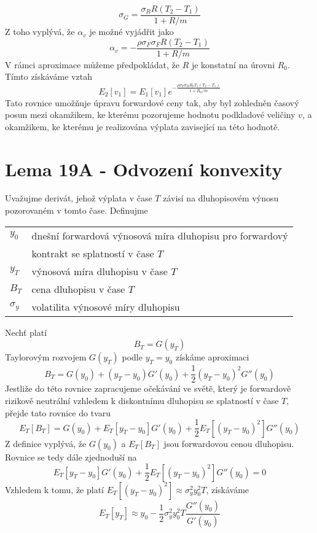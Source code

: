 \documentclass[a4paper]{book}
\begin{document}
\begin{equation*}  
\sigma_G = \frac{\sigma_R R(T_2 - T_1)}{1 + R/m}
\end{equation*}
Z toho vyplývá, že $\alpha_v$ je možné vyjádřit jako
\begin{equation*}  
\alpha_v = - \frac{\rho \sigma_F \sigma_F R(T_2 - T_1)}{1 + R/m}
\end{equation*}
V rámci aproximace můžeme předpokládat, že $R$ je konstatní na úrovni $R_0$. Tímto získáváme vztah
\begin{equation*}
E_2[v_1] = E_1[v_1]e^{-\frac{\rho \sigma_F \sigma_R R_0 T_1 (T_2 - T_1)}{1 + R_0/m}}
\end{equation*}
Tato rovnice umožňuje úpravu forwardové ceny tak, aby byl zohledněn časový posun mezi okamžikem, ke kterému pozorujeme hodnotu podkladové veličiny $v$, a okamžikem, ke kterému je realizována výplata zavisející na této hodnotě.

\section{Lema 19A - Odvození konvexity}

Uvažujme derivát, jehož výplata v čase $T$ závisí na dluhopisovém výnosu pozorovaném v tomto čase. Definujme
\begin{center}
\begin{tabular}{l l}
$y_0$ & dnešní forwardová výnosová míra dluhopisu pro forwardový\\
 & kontrakt se splatností v čase $T$\\
$y_T$ & výnosová míra dluhopisu v čase $T$\\
$B_T$ & cena dluhopisu v čase $T$\\
$\sigma_y$ & volatilita výnosové míry dluhopisu\\
\end{tabular}
\end{center}
Nechť platí
\begin{equation*}
B_T = G(y_T)
\end{equation*}
Taylorovým rozvojem $G(y_T)$ podle $y_T = y_0$ získáme aproximaci
\begin{equation*}
B_T = G(y_0) + (y_T - y_0)G'(y_0)+ \frac{1}{2}(y_T - y_0)^2 G''(y_0)
\end{equation*}
Jestliže do této rovnice zapracujeme očekávání ve světě, který je forwardově rizikově neutrální vzhledem k diskontnímu dluhopisu se splatností v čase $T$, přejde tato rovnice do tvaru
\begin{equation*}
E_T[B_T]=G(y_0)+E_T[y_T - y_0]G'(y_0) + \frac{1}{2} E_T[(y_T - y_0)^2]G''(y_0)
\end{equation*}
Z definice vyplývá, že $G(y_0)$ a $E_T[B_T]$ jsou forwardovou cenou dluhopisu. Rovnice se tedy dále zjednoduší na
\begin{equation*}
E_T[y_T - y_0]G'(y_0) + \frac{1}{2} E_T[(y_T - y_0)^2]G''(y_0) = 0
\end{equation*}
Vzhledem k tomu, že platí $E_T[(y_T - y_0)^2] \approx \sigma^2_y y^2_0 T$, získáváme
\begin{equation*}
E_T[y_T] \approx y_0 - \frac{1}{2} \sigma^2_y y^2_0 T \frac{G''(y_0)}{G'(y_0)}
\end{equation*}
\end{document}
